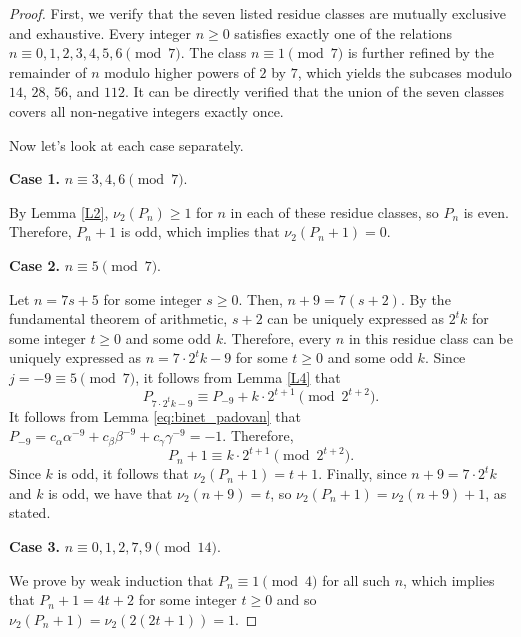 \documentclass[11pt,a4paper]{article}
\numberwithin{equation}{section}
\numberwithin{table}{section}
\numberwithin{figure}{section}
\begin{document}
\begin{proof}
	First, we verify that the seven listed residue classes are 
	mutually exclusive and exhaustive. Every integer $n\ge 0$ 
	satisfies exactly one of the relations $n\equiv 0,1,2,3,4,5,6\pmod{7}$. 
	The class $n\equiv 1\pmod{7}$ is further refined by the 
	remainder of $n$ modulo higher powers of $2$ by $7$, 
	which yields the subcases modulo $14$, $28$, $56$, and $112$. 
	It can be directly verified that the union of the seven classes 
	covers all non-negative integers exactly once.
	
	Now let's look at each case separately.
	
	\medskip
	\noindent\textbf{Case 1.} $n\equiv 3,4,6\pmod{7}$.
	
	By Lemma \ref{L2}, $\nu_2(P_n)\ge 1$ for $n$ in each of 
	these residue classes, so $P_n$ is even. Therefore, $P_n+1$ 
	is odd, which implies that $\nu_2(P_n+1)=0$.
	
		\medskip
	\noindent\textbf{Case 2.} $n\equiv 5\pmod{7}$.
	
	Let $n=7s+5$ for some integer $s\ge 0$. Then, $n+9=7(s+2)$. By the fundamental theorem of arithmetic, $s+2$ can be uniquely expressed as $2^{t}k$ for some integer $t\ge 0$ and some odd $k$. Therefore, every $n$ in this residue 
	class can be uniquely expressed as $n=7\cdot 2^t k-9$ for 
	some $t\ge 0$ and some odd $k$. Since 
	$j=-9\equiv 5\pmod{7}$, it follows from Lemma \ref{L4} that
	\begin{equation*}
		P_{7\cdot 2^t k-9}\equiv P_{-9}+k\cdot 2^{t+1}
		\pmod{2^{t+2}}.
	\end{equation*}
	It follows from Lemma \ref{eq:binet_padovan} that $P_{-9}=c_{\alpha}\alpha^{-9}+c_{\beta}\beta^{-9}+c_{\gamma}\gamma^{-9}=-1$. Therefore,
	\begin{equation*}
		P_n+1\equiv k\cdot 2^{t+1}\pmod{2^{t+2}}.
	\end{equation*}
	Since $k$ is odd, it follows that $\nu_2(P_n+1)=t+1$. 
	Finally, since $n+9=7\cdot 2^t k$ and $k$ is odd, we 
	have that $\nu_2(n+9)=t$, so $\nu_2(P_n+1)=\nu_2(n+9)+1$, as stated.
	
	\medskip
	\noindent\textbf{Case 3.} $n\equiv 0,1,2,7,9\pmod{14}$.
	
	We prove by weak induction that $P_n\equiv 1\pmod{4}$ for all such $n$, which implies that $P_{n}+1=4t+2$ for some integer $t\ge 0$ and so $\nu_2(P_n+1)=\nu_{2}(2(2t+1))=1$.
	

\end{proof}
\end{document}
